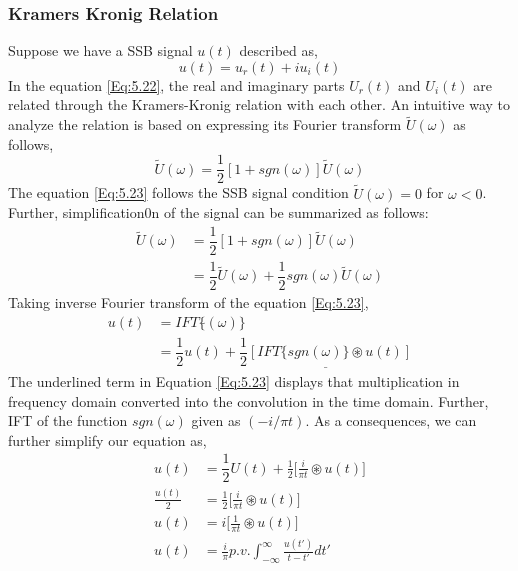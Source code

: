 \subsubsection{Kramers Kronig Relation}
Suppose we have a SSB signal $u(t)$ described as,
\begin{equation}
u(t)=u_r(t)+iu_i(t)
\label{Eq:5.22}
\end{equation}
In the equation \ref{Eq:5.22}, the real and imaginary parts $U_r(t)$ and $U_i(t)$ are related through the Kramers-Kronig relation with each other. An intuitive way to analyze the relation is based on expressing its Fourier transform $\tilde{U}(\omega)$ as follows,
\begin{equation}
\tilde{U}(\omega)=\dfrac{1}{2}[1+sgn(\omega)]\tilde{U}(\omega)
\label{Eq:5.23}
\end{equation}
The equation \ref{Eq:5.23} follows the SSB signal condition $\tilde{U}(\omega)=0$ for $\omega<0$. Further, simplification0n of the signal can be summarized as follows:
\begin{equation}
\begin{split}
\tilde{U}(\omega)&=\dfrac{1}{2}[1+sgn(\omega)]\tilde{U}(\omega)\\
				 &=\dfrac{1}{2}\tilde{U}(\omega)+\dfrac{1}{2}sgn(\omega)\tilde{U}(\omega)
\end{split}
\label{Eq:5.23}
\end{equation}
Taking inverse Fourier transform of the equation \ref{Eq:5.23},
\begin{equation}
\begin{split}
	{u}(t)&=IFT\{\tilde{}(\omega)\}\\
	      &=\dfrac{1}{2}{u}(t)+\underline{\dfrac{1}{2}[IFT\{sgn(\omega)\} \circledast {u}(t)]}
\end{split}
\label{Eq:5.23}
\end{equation}
The underlined term in Equation \ref{Eq:5.23} displays that multiplication in frequency domain converted into the convolution in the time domain. Further, IFT of the function $sgn(\omega)$ given as $(-i/\pi t)$. As a consequences, we can further simplify our equation as,
\begin{equation}
\begin{split}
{u}(t)&=\dfrac{1}{2}{U}(t)+\frac{1}{2}\bigg[\frac{i}{\pi t} \circledast {u}(t) \bigg]\\
\frac{{u}(t)}{2} &=\frac{1}{2}\bigg[\frac{i}{\pi t} \circledast {u}(t) \bigg]\\
{u}(t) &=i\bigg[\frac{1}{\pi t} \circledast {u}(t) \bigg]\\
{u}(t) &=\frac{i}{\pi} p.v. \int_{-\infty}^{\infty} \frac{u(t')}{t-t'} dt' 
\end{split}
\label{Eq:5.24}
\end{equation}
